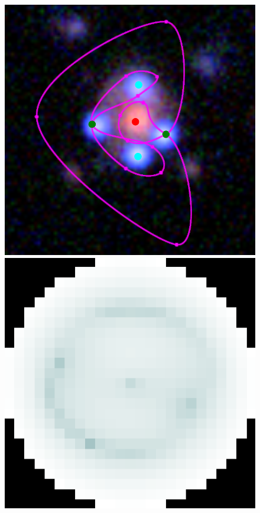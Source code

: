 \begin{figure}
  \centering

  \includegraphics[width=\myplotswidth]{fig/007025_input}
  \includegraphics[width=\myplotswidth]{fig/007025_arr_time} \\

\end{figure}
